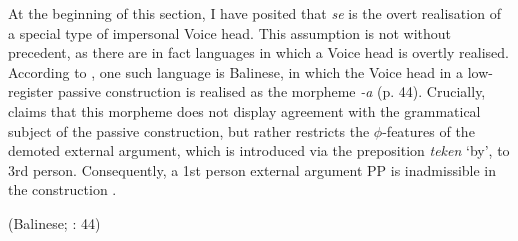 \documentclass[output=paper,
modfonts,nonflat,
newtxmath
]{langsci/langscibook}
\begin{document}
\begin{exe}
\ex \begin{xlist}
 \label{ex:lenardic: 26a}
 \label{ex:lenardic: 26b}
\end{xlist}
\end{exe} \par

\noindent At the beginning of this section, I have posited that \textit{se} is the overt realisation of a special type of impersonal Voice head. This assumption is not without precedent, as there are in fact languages in which a Voice head is overtly realised. According to \citet{legate2014}, one such language is Balinese, in which the Voice head in a low-register passive construction is realised as the morpheme \textit{-a} (p. 44). Crucially, \citet{legate2014} claims that this morpheme does not display agreement with the grammatical subject of the passive construction, but rather restricts the $\phi$-features of the demoted external argument, which is introduced via the preposition \textit{teken} `by', to 3rd person. Consequently, a 1st person external argument PP is inadmissible in the construction .

\begin{exe}
\ex \begin{xlist}
\label{ex:lenardic: 27a}
\hfill (Balinese; \citealt{legate2014}: 44)\label{ex:lenardic: 27b}
\end{xlist}
\end{exe}\par
\end{document}
